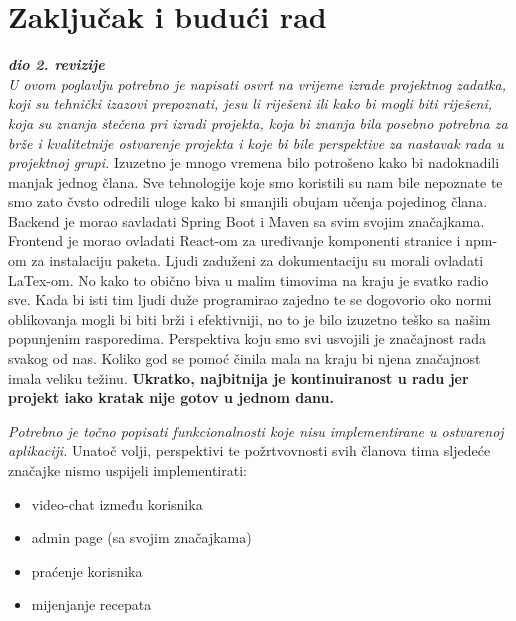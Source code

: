 \chapter{Zaključak i budući rad}
		
		\textbf{\textit{dio 2. revizije}}\\
		
		 \textit{U ovom poglavlju potrebno je napisati osvrt na vrijeme izrade projektnog zadatka, koji su tehnički izazovi prepoznati, jesu li riješeni ili kako bi mogli biti riješeni, koja su znanja stečena pri izradi projekta, koja bi znanja bila posebno potrebna za brže i kvalitetnije ostvarenje projekta i koje bi bile perspektive za nastavak rada u projektnoj grupi.}
		 \noindent Izuzetno je mnogo vremena bilo potrošeno kako bi nadoknadili manjak jednog člana. Sve tehnologije koje smo koristili su nam bile nepoznate te smo zato čvsto odredili uloge kako bi smanjili obujam učenja pojedinog člana.
		 \noindent Backend je morao savladati Spring Boot i Maven sa svim svojim značajkama. Frontend je morao ovladati React-om za uređivanje komponenti stranice i npm-om za instalaciju paketa. Ljudi zaduženi za dokumentaciju su morali ovladati LaTex-om.
		 \noindent No kako to obično biva u malim timovima na kraju je svatko radio sve. Kada bi isti tim ljudi duže programirao zajedno te se dogovorio oko normi oblikovanja mogli bi biti brži i efektivniji, no to je bilo izuzetno teško sa našim popunjenim rasporedima.
		 \noindent Perspektiva koju smo svi usvojili je značajnost rada svakog od nas. Koliko god se pomoć činila mala na kraju bi njena značajnost imala veliku težinu.
		 \noindent \textbf{Ukratko, najbitnija je kontinuiranost u radu jer projekt iako kratak nije gotov u jednom danu.}
		 
		 \textit{Potrebno je točno popisati funkcionalnosti koje nisu implementirane u ostvarenoj aplikaciji.}
		 \noindent Unatoč volji, perspektivi te požrtvovnosti svih članova tima sljedeće značajke nismo uspijeli implementirati:
		\begin{itemize}
			\item video-chat između korisnika
			\item admin page (sa svojim značajkama)
			\item praćenje korisnika
			\item mijenjanje recepata
		\end{itemize}
		
		\eject 